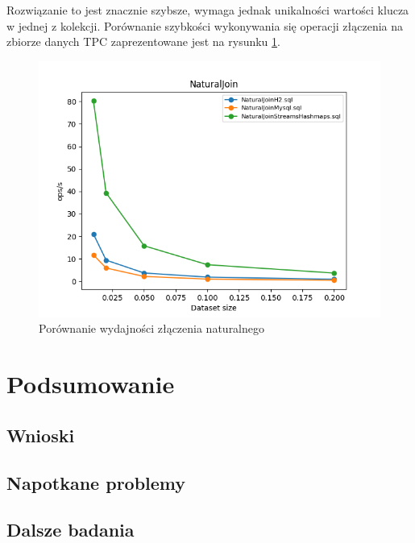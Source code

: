 \documentclass[12pt]{extarticle}
\begin{document}
Rozwiązanie to jest znacznie szybsze, wymaga jednak unikalności wartości klucza w jednej z kolekcji. Porównanie szybkości wykonywania się operacji złączenia na zbiorze danych TPC zaprezentowane jest na rysunku \ref{fig:naturaljoin}.

\begin{figure}[H]
    \centering
    \includegraphics[width=13cm]{plots/NaturalJoin}
    \caption{Porównanie wydajności złączenia naturalnego}
    \label{fig:naturaljoin}
\end{figure}

\section{Podsumowanie}

\subsection{Wnioski}
\subsection{Napotkane problemy}
\subsection{Dalsze badania}
\end{document}
